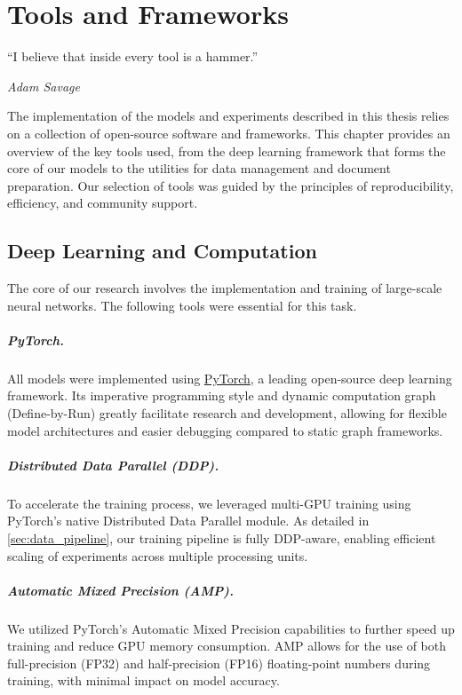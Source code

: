 \chapter{Tools and Frameworks}
\label{c:tools}

\epigraph{\enquote{I believe that inside every tool is a hammer.}}{\emph{Adam Savage}}

The implementation of the models and experiments described in this thesis relies on a collection of open-source software and frameworks. This chapter provides an overview of the key tools used, from the deep learning framework that forms the core of our models to the utilities for data management and document preparation. Our selection of tools was guided by the principles of reproducibility, efficiency, and community support.

\section{Deep Learning and Computation}
The core of our research involves the implementation and training of large-scale neural networks. The following tools were essential for this task.

\paragraph{PyTorch.} All models were implemented using \href{https://pytorch.org/}{PyTorch}, a leading open-source deep learning framework. Its imperative programming style and dynamic computation graph (Define-by-Run) greatly facilitate research and development, allowing for flexible model architectures and easier debugging compared to static graph frameworks.

\paragraph{Distributed Data Parallel (DDP).} To accelerate the training process, we leveraged multi-GPU training using PyTorch's native Distributed Data Parallel module. As detailed in \cref{sec:data_pipeline}, our training pipeline is fully DDP-aware, enabling efficient scaling of experiments across multiple processing units.

\paragraph{Automatic Mixed Precision (AMP).} We utilized PyTorch's Automatic Mixed Precision capabilities to further speed up training and reduce GPU memory consumption. AMP allows for the use of both full-precision (FP32) and half-precision (FP16) floating-point numbers during training, with minimal impact on model accuracy.

